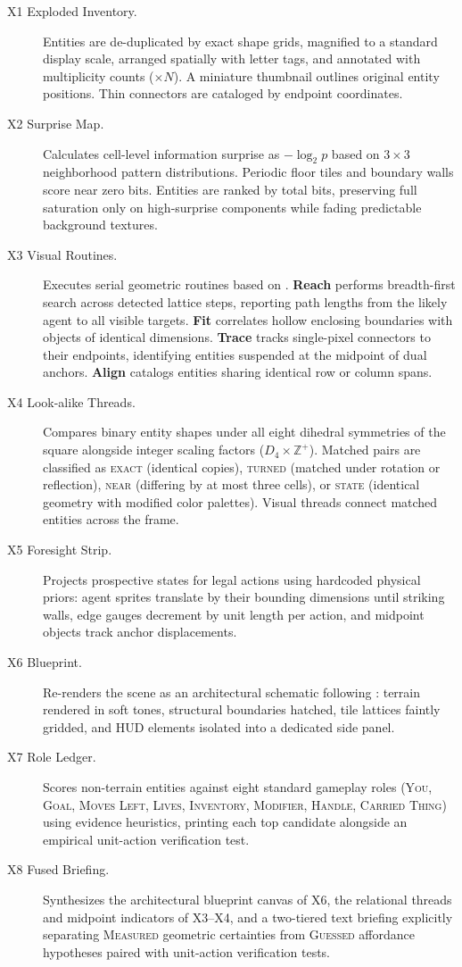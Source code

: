 \begin{description}
    \item[X1 Exploded Inventory.] Entities are de-duplicated by exact shape grids, magnified to a standard display scale, arranged spatially with letter tags, and annotated with multiplicity counts ($\times N$). A miniature thumbnail outlines original entity positions. Thin connectors are cataloged by endpoint coordinates.
    \item[X2 Surprise Map.] Calculates cell-level information surprise as $-\log_2 p$ based on $3{\times}3$ neighborhood pattern distributions. Periodic floor tiles and boundary walls score near zero bits. Entities are ranked by total bits, preserving full saturation only on high-surprise components while fading predictable background textures.
    \item[X3 Visual Routines.] Executes serial geometric routines based on \citet{ullman1984visual}. \textbf{Reach} performs breadth-first search across detected lattice steps, reporting path lengths from the likely agent to all visible targets. \textbf{Fit} correlates hollow enclosing boundaries with objects of identical dimensions. \textbf{Trace} tracks single-pixel connectors to their endpoints, identifying entities suspended at the midpoint of dual anchors. \textbf{Align} catalogs entities sharing identical row or column spans.
    \item[X4 Look-alike Threads.] Compares binary entity shapes under all eight dihedral symmetries of the square alongside integer scaling factors ($D_4 \times \mathbb{Z}^+$). Matched pairs are classified as \textsc{exact} (identical copies), \textsc{turned} (matched under rotation or reflection), \textsc{near} (differing by at most three cells), or \textsc{state} (identical geometry with modified color palettes). Visual threads connect matched entities across the frame.
    \item[X5 Foresight Strip.] Projects prospective states for legal actions using hardcoded physical priors: agent sprites translate by their bounding dimensions until striking walls, edge gauges decrement by unit length per action, and midpoint objects track anchor displacements.
    \item[X6 Blueprint.] Re-renders the scene as an architectural schematic following \citet{marr1982vision}: terrain rendered in soft tones, structural boundaries hatched, tile lattices faintly gridded, and HUD elements isolated into a dedicated side panel.
    \item[X7 Role Ledger.] Scores non-terrain entities against eight standard gameplay roles (\textsc{You}, \textsc{Goal}, \textsc{Moves Left}, \textsc{Lives}, \textsc{Inventory}, \textsc{Modifier}, \textsc{Handle}, \textsc{Carried Thing}) using evidence heuristics, printing each top candidate alongside an empirical unit-action verification test.
    \item[X8 Fused Briefing.] Synthesizes the architectural blueprint canvas of X6, the relational threads and midpoint indicators of X3--X4, and a two-tiered text briefing explicitly separating \textsc{Measured} geometric certainties from \textsc{Guessed} affordance hypotheses paired with unit-action verification tests.
\end{description}

